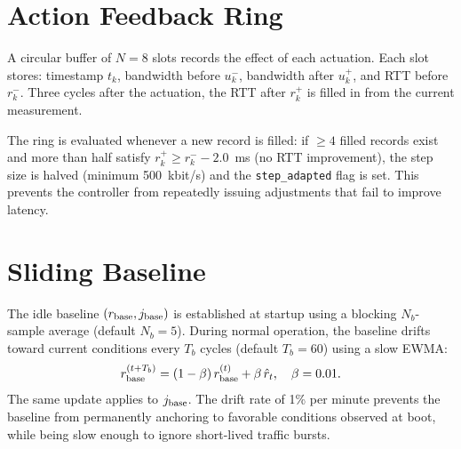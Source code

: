 \section{Action Feedback Ring}

A circular buffer of $N=8$ slots records the effect of each actuation. Each slot stores: timestamp $t_k$, bandwidth before $u_k^-$, bandwidth after $u_k^+$, and RTT before $r_k^-$. Three cycles after the actuation, the RTT after $r_k^+$ is filled in from the current measurement.

The ring is evaluated whenever a new record is filled: if $\geq 4$ filled records exist and more than half satisfy $r_k^+ \geq r_k^- - 2.0$~ms (no RTT improvement), the step size is halved (minimum 500~kbit/s) and the \texttt{step\_adapted} flag is set. This prevents the controller from repeatedly issuing adjustments that fail to improve latency.

\section{Sliding Baseline}
\label{sec:baseline}

The idle baseline $(r_{\rm base}, j_{\rm base})$ is established at startup using a blocking $N_b$-sample average (default $N_b=5$). During normal operation, the baseline drifts toward current conditions every $T_b$ cycles (default $T_b=60$) using a slow EWMA:
\begin{equation}
  r_{\rm base}^{(t+T_b)} = (1-\beta)\,r_{\rm base}^{(t)} + \beta\,\hat{r}_t,
  \quad \beta = 0.01.
  \label{eq:baseline}
\end{equation}
The same update applies to $j_{\rm base}$. The drift rate of 1\% per minute prevents the baseline from permanently anchoring to favorable conditions observed at boot, while being slow enough to ignore short-lived traffic bursts.
